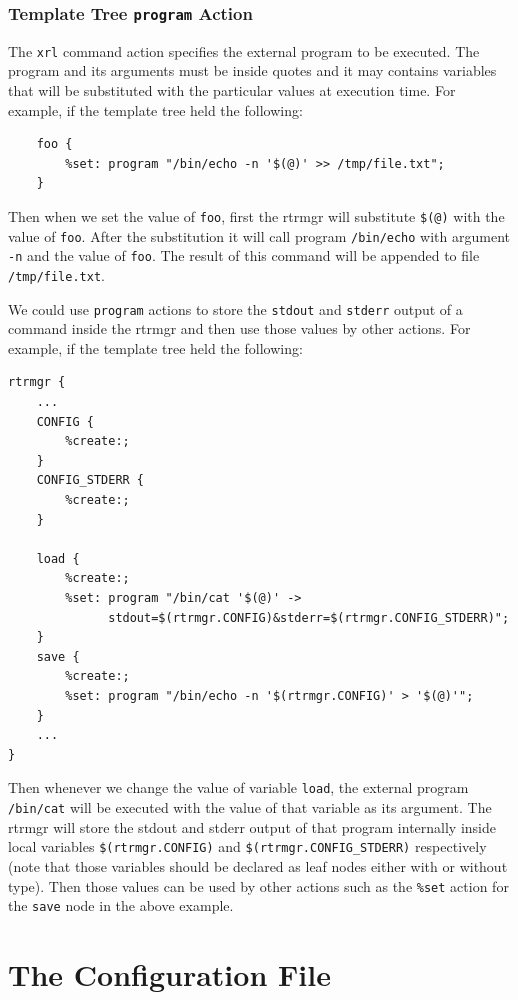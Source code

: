 \documentclass[11pt]{article}
\begin{document}
\subsubsection{Template Tree {\tt program} Action}

The {\tt xrl} command action specifies the external program to be executed.
The program and its arguments must be inside quotes and it may contains
variables that will be substituted with the particular values at execution
time.
For example, if the template tree held the following:

\begin{verbatim}
    foo {
        %set: program "/bin/echo -n '$(@)' >> /tmp/file.txt";
    }
\end{verbatim}

Then when we set the value of {\tt foo}, first the rtrmgr will substitute
{\tt \$(@)} with the value of {\tt foo}. After the substitution it will
call program {\tt /bin/echo} with argument {\tt -n} and the value
of {\tt foo}. The result of this command will be appended to file
{\tt /tmp/file.txt}.

We could use {\tt program} actions to store the {\tt stdout} and {\tt stderr}
output of a command inside the rtrmgr and then use those values by other
actions.
For example, if the template tree held the following:

\begin{verbatim}
rtrmgr {
    ...
    CONFIG {
        %create:;
    }
    CONFIG_STDERR {
        %create:;
    }

    load {
        %create:;
        %set: program "/bin/cat '$(@)' ->
              stdout=$(rtrmgr.CONFIG)&stderr=$(rtrmgr.CONFIG_STDERR)";
    }
    save {
        %create:;
        %set: program "/bin/echo -n '$(rtrmgr.CONFIG)' > '$(@)'";
    }
    ...
}
\end{verbatim}

Then whenever we change the value of variable {\tt load}, the external
program {\tt /bin/cat} will be executed with the value of that variable as
its argument. The rtrmgr will store the stdout and stderr output of
that program internally inside local variables {\tt \$(rtrmgr.CONFIG)}
and {\tt \$(rtrmgr.CONFIG\_STDERR)} respectively (note that those variables
should be declared as leaf nodes either with or without type).
Then those values can be used by other actions such as the {\tt \%set}
action for the {\tt save} node in the above example.

\newpage

\section{The Configuration File}
\end{document}
